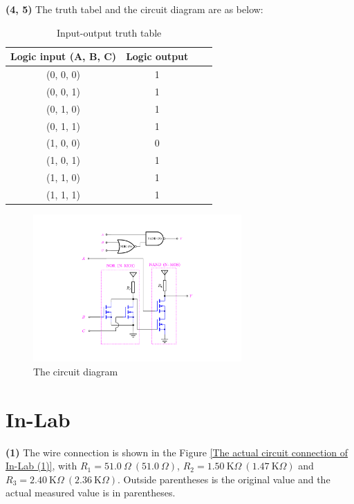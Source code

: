\documentclass[UTF8]{report}
\def\kO{\ \mathrm{K}\Omega}
\def\KO{\ \mathrm{K}\Omega}
\theoremstyle{MyLineTheoremStyle} %
\theoremstyle{MyBlockTheoremStyle} %
\theoremstyle{MySubsubsectionStyle} %
\begin{document}
\noindent \textbf{(4, 5)}
The truth tabel and the circuit diagram are as below:
\begin{center}\noindent\begin{minipage}{0.52\columnwidth}
    \begin{table}[H]\centering
        \caption{Input-output truth table}
        \label{Input-output truth table}
    \begin{tabular}{cccc}\hline
        Logic input (A, B, C) & Logic output \\
        \hline
        (0, 0, 0) & 1 \\
        (0, 0, 1) & 1 \\
        (0, 1, 0) & 1 \\
        (0, 1, 1) & 1 \\
        (1, 0, 0) & 0 \\
        (1, 0, 1) & 1 \\
        (1, 1, 0) & 1 \\
        (1, 1, 1) & 1 \\
        \hline
    \end{tabular}
    \end{table}
\end{minipage}\hfill\begin{minipage}{0.47\columnwidth}
\begin{figure}[H]\centering
\includegraphics[height=160pt]{assets/Lab1/Pre-Lab (5).pdf}
\caption{The circuit diagram}
\end{figure}
\end{minipage}\end{center}

\section{In-Lab}

\noindent \textbf{(1)  }
The wire connection is shown in the  Figure \ref{The actual circuit connection of In-Lab (1)}, with $R_1 = 51.0 \ \Omega\ (51.0 \ \Omega)$, $R_2 = 1.50 \kO\ (1.47 \kO)$ and $R_3 = 2.40 \kO\ (2.36 \KO)$. Outside parentheses is the original value and the actual measured value is in parentheses.
\end{document}

